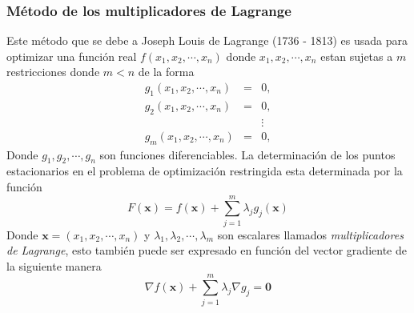 \subsubsection{Método de los multiplicadores de Lagrange}
\label{Mult_Lagrange}
Este método que se debe a Joseph Louis de Lagrange (1736 - 1813) es usada para optimizar una función real $f({x}_{1}, {x}_{2}, \cdots, {x}_{n})$ donde ${x}_{1}, {x}_{2}, \cdots , {x}_{n}$ estan sujetas a $m$ restricciones donde $m <n$ de la forma
\begin{eqnarray}
	{g}_{1} ({x}_{1}, {x}_{2}, \cdots , {x}_{n}) &=& 0, \nonumber \\
	{g}_{2} ({x}_{1}, {x}_{2}, \cdots , {x}_{n}) &=& 0, \nonumber \\
	 &  & \vdots \nonumber \\
	{g}_{m} ({x}_{1}, {x}_{2}, \cdots , {x}_{n}) &=& 0, \nonumber
\end{eqnarray}
Donde ${g}_{1}, {g}_{2}, \cdots , {g}_{n}$ son funciones diferenciables. La determinación de los puntos estacionarios en el problema de optimización restringida esta determinada por la función
$$
F(\mathbf{x}) = f (\mathbf{x}) + \sum\limits_{j = 1}^{m} {\lambda}_{j} {g}_{j} \mathbf{(x)}
$$
Donde $\mathbf{x}=({x}_{1}, {x}_{2}, \cdots , {x}_{n})$ y ${\lambda}_{1}, {\lambda}_{2}, \cdots , {\lambda}_{m}$ son escalares llamados \textsl{multiplicadores de Lagrange}, esto también puede ser expresado en función del vector gradiente de la siguiente manera
$$
\nabla f (\mathbf{x}) + \sum\limits_{j = 1}^{m} {\lambda}_{j} \nabla {g}_{j} = \mathbf{0}
$$

